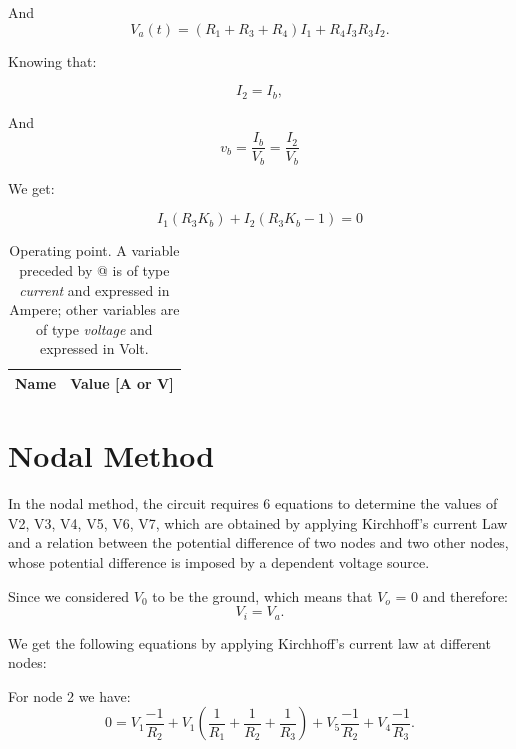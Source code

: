 And
\begin{equation}
  V_a(t) = (R_1 + R_3 + R_4)I_1 + R_4I_3 R_3I_2.
  \label{eq:kvl2}
\end{equation}

Knowing that:

\begin{equation}
  I_2 = I_b,
  \label{eq:vo_sol}
\end{equation}

And
\begin{equation}
  v_b = \frac{I_b}{V_b} = \frac{I_2}{V_b}
  \label{eq:vo_nat}
\end{equation}

We get:

\begin{equation}
  I_1(R_3K_b) + I_2(R_3K_b -1) = 0 
\end{equation}

\begin{table}[h]
  \centering
  \begin{tabular}{|l|r|}
    \hline    
    {\bf Name} & {\bf Value [A or V]} \\ \hline
    
  \end{tabular}
  \caption{Operating point. A variable preceded by @ is of type {\em current}
    and expressed in Ampere; other variables are of type {\it voltage} and expressed in
    Volt.}
  \label{tab:op}
\end{table}

\section{Nodal Method}\label{sec:frequency-response}

In the nodal method, the circuit requires 6 equations to determine the values of V2, V3, V4, V5, V6, V7, which are obtained by applying Kirchhoff's current Law and a relation between the potential difference of two nodes and two other nodes, whose potential difference is imposed by a dependent voltage source. 

Since we considered $V_0$ to be the ground, which means that $V_o$ = 0 and therefore:
\begin{equation}
	V_i = V_a.
	\label{eq:kvl}
\end{equation}

We get the following equations by applying Kirchhoff's current law at different nodes:

For node 2 we have:
\begin{equation}
	0 = V_1\frac{-1}{R_2} + V_1(\frac{1}{R_1} + \frac{1}{R_2} + \frac{1}{R_3}) + V_5\frac{-1}{R_2} + V_4\frac{-1}{R_3}.
\end{equation}

